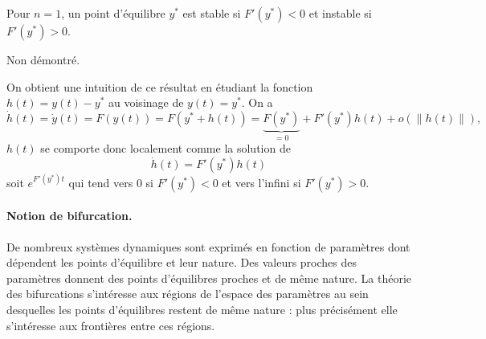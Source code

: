 \begin{theorem}[Stabilité ($n = 1$)]
  Pour $n=1$, un point d'équilibre $y^*$ est stable si $F'(y^*) < 0$ et instable si $F'(y^*) > 0$.
\end{theorem}

\proof Non démontré. \eproof

\remark
On obtient une intuition de ce résultat en étudiant la fonction $h(t) = y(t) - y^*$ au voisinage de $y(t) = y^*$. On a
$$
\dot h(t) = \dot y(t) = F(y(t)) = F(y^* + h(t)) = \underset{=0}{\underbrace{F(y^*)}} + F'(y^*) h(t) + o(\|h(t)\|),
$$
$h(t)$ se comporte donc localement comme la solution de 
$$
\dot h(t) = F'(y^*) h(t)
$$
soit $e ^{F'(y^*) t}$ qui tend vers 0 si $F'(y^*) < 0$ et vers l'infini si $F'(y^*) > 0$.


\paragraph*{Notion de bifurcation.}
De nombreux systèmes dynamiques sont exprimés en fonction de paramètres dont dépendent les points d'équilibre et leur nature. Des valeurs proches des paramètres donnent des points d'équilibres proches et de même nature. La théorie des bifurcations s'intéresse aux régions de l'espace des paramètres au sein desquelles les points d'équilibres restent de même nature : plus précisément elle s'intéresse aux frontières entre ces régions.


